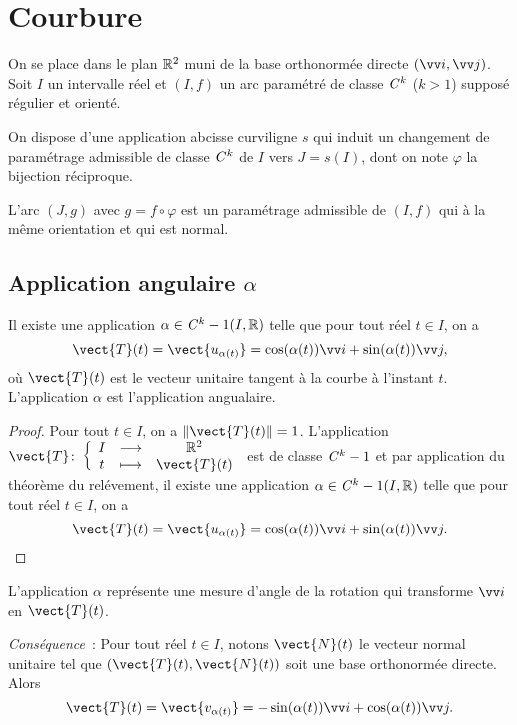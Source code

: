 \section{Courbure}

On se place dans le plan $\mathbb{R}^2$ muni de la base orthonormée directe $(\vi, \vj)$. Soit $I$ un intervalle réel et $(I,f)$ un arc paramétré de classe $\mathit{C}^k$ ($k>1$) supposé régulier et orienté. 

On dispose d'une application abcisse curviligne $s$ qui induit un changement de paramétrage admissible de classe $\mathit{C}^k$ de $I$ vers $J=s(I)$, dont on note $\varphi$ la bijection réciproque.

L'arc $(J, g)$ avec $g=f \circ \varphi$ est un paramétrage admissible de $(I,f)$ qui à la même orientation et qui est normal.

\subsection{Application angulaire $\alpha$}

\begin{prop}
  Il existe une application $\alpha \in \mathit{C}^k-1(I, \mathbb{R})$ telle que pour tout réel $t \in I$, on a
  \begin{equation}
    \vect{T}(t) = \vect{u_{\alpha(t)}} = \cos(\alpha(t)) \vi + \sin(\alpha(t)) \vj,
  \end{equation}
  où $\vect{T}(t)$ est le vecteur unitaire tangent à la courbe à l'instant $t$. L'application $\alpha$ est l'application angualaire.
\end{prop}
\begin{proof}
  Pour tout $t \in I$, on a $\norme{\vect{T}(t)}=1$. L'application $\fonction{\vect{T}}{I}{\R^2}{t}{\vect{T}(t)}$ est de classe $\mathit{C}^k-1$ et par application du théorème du relévement, il existe une application $\alpha \in \mathit{C}^k-1(I, \mathbb{R})$ telle que pour tout réel $t \in I$, on a
  \begin{equation}
    \vect{T}(t) = \vect{u_{\alpha(t)}} = \cos(\alpha(t)) \vi + \sin(\alpha(t)) \vj.
  \end{equation}
\end{proof}

L'application $\alpha$ représente une mesure d'angle de la rotation qui transforme $\vi$ en $\vect{T}(t)$.

\emph{Conséquence}~: Pour tout réel $t \in I$, notons $\vect{N}(t)$ le vecteur normal unitaire tel que $(\vect{T}(t), \vect{N}(t))$ soit une base orthonormée directe. Alors 
\begin{equation}
  \vect{T}(t) = \vect{v_{\alpha(t)}} = -\sin(\alpha(t)) \vi + \cos(\alpha(t)) \vj.
\end{equation}

